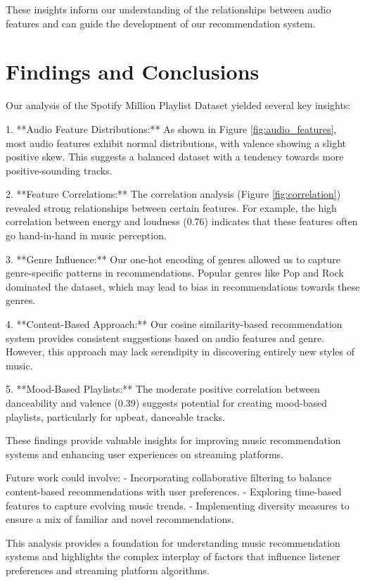 \documentclass[runningheads]{llncs}
\begin{document}
These insights inform our understanding of the relationships between audio features and can guide the development of our recommendation system.

\section{Findings and Conclusions}

Our analysis of the Spotify Million Playlist Dataset yielded several key insights:

1. **Audio Feature Distributions:** As shown in Figure \ref{fig:audio_features}, most audio features exhibit normal distributions, with valence showing a slight positive skew. This suggests a balanced dataset with a tendency towards more positive-sounding tracks.
    
2. **Feature Correlations:** The correlation analysis (Figure \ref{fig:correlation}) revealed strong relationships between certain features. For example, the high correlation between energy and loudness (0.76) indicates that these features often go hand-in-hand in music perception.
    
3. **Genre Influence:** Our one-hot encoding of genres allowed us to capture genre-specific patterns in recommendations. Popular genres like Pop and Rock dominated the dataset, which may lead to bias in recommendations towards these genres.
    
4. **Content-Based Approach:** Our cosine similarity-based recommendation system provides consistent suggestions based on audio features and genre. However, this approach may lack serendipity in discovering entirely new styles of music.
 
5. **Mood-Based Playlists:** The moderate positive correlation between danceability and valence (0.39) suggests potential for creating mood-based playlists, particularly for upbeat, danceable tracks.

These findings provide valuable insights for improving music recommendation systems and enhancing user experiences on streaming platforms.

Future work could involve:
- Incorporating collaborative filtering to balance content-based recommendations with user preferences.
- Exploring time-based features to capture evolving music trends.
- Implementing diversity measures to ensure a mix of familiar and novel recommendations.

This analysis provides a foundation for understanding music recommendation systems and highlights the complex interplay of factors that influence listener preferences and streaming platform algorithms.
\end{document}
